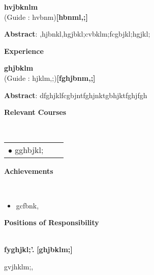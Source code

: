\documentclass[a4paper,10pt]{article}
\begin{document}
\begin{itemize*}
\setlength{\itemsep}{1pt}
\item \textbf{hvjbknlm}
 \\ {(Guide : hvbnm)}\hfill {\small{{\textbf{[hbnml,;]}}\/}}
\begin{itemize*}
\setlength{\itemsep}{.00pt}

            \item \textbf{Abstract}: ,hjbnkl,hgjbkl;cvbklm;fcgbjkl;hgjkl; 

            \end{itemize*} 

            \end{itemize*} 

\colorbox{titleColor}{\parbox{6.7in}{\textbf{Experience}}}

\begin{itemize*}
\setlength{\itemsep}{1pt}
\item \textbf{ghjbklm}
 \\ {(Guide : hjklm,;)}\hfill {\small{{\textbf{[fghjbnm,;]}}\/}}
\begin{itemize*}
\setlength{\itemsep}{.00pt}

            \item \textbf{Abstract}: dfghjklfcgbjntfghjnktgbhjktfghjfgh 

            \end{itemize*} 

            \end{itemize*} 

\colorbox{titleColor}{\parbox{6.7in}{\textbf{Relevant Courses}}}\\[0.08in]
    \begin{tabular}{p{3.5in}p{3in}p{2.5in}}
\hspace{0.9pc}$\bullet$ gghbjkl;
\end{tabular}

\colorbox{titleColor}{\parbox{6.7in}{\textbf{Achievements}}}\\[0.08in]

    \begin{itemize} 
 \setlength{\itemsep}{1pt}
\item gcfbnk,
\end{itemize}

\colorbox{titleColor}{\parbox{6.7in}{\textbf{Positions of Responsibility}}}\\

\textbf{fyghjkl;'.}  \hfill {\small{{\textbf{[ghjbklm;]}}}\/} 
\begin{itemize*} 

        \item gvjhklm;, 

        \end{itemize*}
\end{document}
